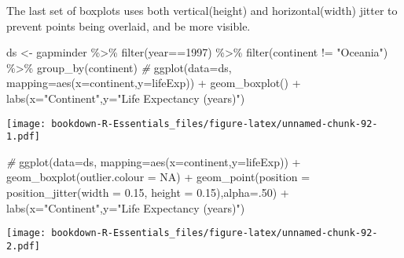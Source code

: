 \documentclass[
]{book}
\newenvironment{Shaded}{\begin{snugshade}}{\end{snugshade}}
\newcommand{\AttributeTok}[1]{\textcolor[rgb]{0.77,0.63,0.00}{#1}}
\newcommand{\CommentTok}[1]{\textcolor[rgb]{0.56,0.35,0.01}{\textit{#1}}}
\newcommand{\ConstantTok}[1]{\textcolor[rgb]{0.00,0.00,0.00}{#1}}
\newcommand{\DecValTok}[1]{\textcolor[rgb]{0.00,0.00,0.81}{#1}}
\newcommand{\FloatTok}[1]{\textcolor[rgb]{0.00,0.00,0.81}{#1}}
\newcommand{\FunctionTok}[1]{\textcolor[rgb]{0.00,0.00,0.00}{#1}}
\newcommand{\NormalTok}[1]{#1}
\newcommand{\OtherTok}[1]{\textcolor[rgb]{0.56,0.35,0.01}{#1}}
\newcommand{\SpecialCharTok}[1]{\textcolor[rgb]{0.00,0.00,0.00}{#1}}
\newcommand{\StringTok}[1]{\textcolor[rgb]{0.31,0.60,0.02}{#1}}
\begin{document}
The last set of boxplots uses both vertical(height) and horizontal(width) jitter to prevent points being overlaid, and be more visible.

\begin{Shaded}
\begin{Highlighting}[]
\NormalTok{ds }\OtherTok{\textless{}{-}}\NormalTok{ gapminder }\SpecialCharTok{\%\textgreater{}\%} 
  \FunctionTok{filter}\NormalTok{(year}\SpecialCharTok{==}\DecValTok{1997}\NormalTok{) }\SpecialCharTok{\%\textgreater{}\%} 
  \FunctionTok{filter}\NormalTok{(continent }\SpecialCharTok{!=} \StringTok{"Oceania"}\NormalTok{) }\SpecialCharTok{\%\textgreater{}\%} 
  \FunctionTok{group\_by}\NormalTok{(continent) }
\CommentTok{\#}
\FunctionTok{ggplot}\NormalTok{(}\AttributeTok{data=}\NormalTok{ds, }\AttributeTok{mapping=}\FunctionTok{aes}\NormalTok{(}\AttributeTok{x=}\NormalTok{continent,}\AttributeTok{y=}\NormalTok{lifeExp)) }\SpecialCharTok{+}
 \FunctionTok{geom\_boxplot}\NormalTok{() }\SpecialCharTok{+} 
  \FunctionTok{labs}\NormalTok{(}\AttributeTok{x=}\StringTok{"Continent"}\NormalTok{,}\AttributeTok{y=}\StringTok{"Life Expectancy (years)"}\NormalTok{)}
\end{Highlighting}
\end{Shaded}

\texttt{[image: bookdown-R-Essentials\_files/figure-latex/unnamed-chunk-92-1.pdf]}

\begin{Shaded}
\begin{Highlighting}[]
\CommentTok{\#}
\FunctionTok{ggplot}\NormalTok{(}\AttributeTok{data=}\NormalTok{ds, }\AttributeTok{mapping=}\FunctionTok{aes}\NormalTok{(}\AttributeTok{x=}\NormalTok{continent,}\AttributeTok{y=}\NormalTok{lifeExp)) }\SpecialCharTok{+}  
 \FunctionTok{geom\_boxplot}\NormalTok{(}\AttributeTok{outlier.colour =} \ConstantTok{NA}\NormalTok{) }\SpecialCharTok{+} 
 \FunctionTok{geom\_point}\NormalTok{(}\AttributeTok{position =} \FunctionTok{position\_jitter}\NormalTok{(}\AttributeTok{width =} \FloatTok{0.15}\NormalTok{, }\AttributeTok{height =} \FloatTok{0.15}\NormalTok{),}\AttributeTok{alpha=}\NormalTok{.}\DecValTok{50}\NormalTok{) }\SpecialCharTok{+}
  \FunctionTok{labs}\NormalTok{(}\AttributeTok{x=}\StringTok{"Continent"}\NormalTok{,}\AttributeTok{y=}\StringTok{"Life Expectancy (years)"}\NormalTok{)}
\end{Highlighting}
\end{Shaded}

\texttt{[image: bookdown-R-Essentials\_files/figure-latex/unnamed-chunk-92-2.pdf]}
\end{document}

